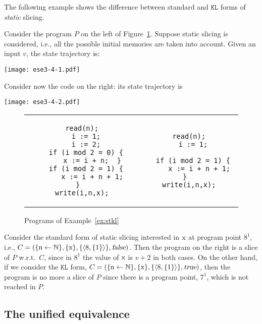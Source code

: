 \documentclass[prodmode,acmtocl]{acmsmall}
\def\prog{\ensuremath{P}\xspace}
\def\crit{\ensuremath{C}\xspace}
\def\KL{\ensuremath{\mathtt{KL}}\xspace}
\newcommand{\la}{\leftarrow}
\newcommand{\false}{\mbox{\sl false}}
\newcommand{\true}{\mbox{\sl true}}
\def\tuple#1{\langle #1 \rangle}
\newcommand{\0}{\mbox{\bf 0}}
\newcommand{\CODE}[1]{\ensuremath{\mbox{\lstinline!#1!}\xspace}\xspace}
\def\xx{\CODE{x}}
\def\nn{\CODE{n}}
\def\NATURALS{\mathbb{N}}
\begin{document}
The following example shows the difference between standard and $\KL$
forms of {\em static} slicing.

\begin{example}\label{ex:stkl}
  Consider the program $\prog$ on the left of Figure~\ref{fig:stkl}.
  Suppose static slicing is considered, i.e., all the possible initial
  memories are taken into account.  Given an input $v$, the state
  trajectory is:
   \begin{center}
\texttt{[image: ese3-4-1.pdf]}
\end{center}
  Consider now the code on the right: its state trajectory is
  \begin{center}
\texttt{[image: ese3-4-2.pdf]}
\end{center}
  \begin{figure}
    \begin{center}
      \begin{tabular}{c|c}
        \begin{lstlisting}
  read(n);
    i := 1;
    i := 2;
    if (i mod 2 = 0) {
       x := i + n;  }
    if (i mod 2 = 1) {
       x := i + n + 1; }
  write(i,n,x);
        \end{lstlisting}
        &
        \begin{lstlisting}
  read(n);
    i := 1;
    
    if (i mod 2 = 1) {
       x := i + n + 1; }
  write(i,n,x);
        \end{lstlisting}
      \end{tabular}
    \end{center}
    \caption{Programs of Example~\ref{ex:stkl}}\label{fig:stkl}
  \end{figure}

  \noindent Consider the standard form of static slicing
  interested in \xx at program point $8^1$, i.e., $\crit=(\{\mbox{\nn}\la \NATURALS\},\{\xx\},\{\tuple{8,\{1\}}\},\false)$.  Then the program
  on the right is a slice of $\prog$ w.r.t.\ $\crit$, since in $8^1$ the value of \xx
  is $v+2$ in both cases.  On the other hand, if we consider the $\KL$
  form, $\crit=(\{\mbox{\nn}\la \NATURALS\},\{\xx\},\{\tuple{8,\{1\}}\},\true)$, then the program is no more a slice
  of $\prog$ since there is a program point, $7^1$, which is not
  reached in $\prog$.
\end{example}

\subsection*{The unified equivalence}
\end{document}
